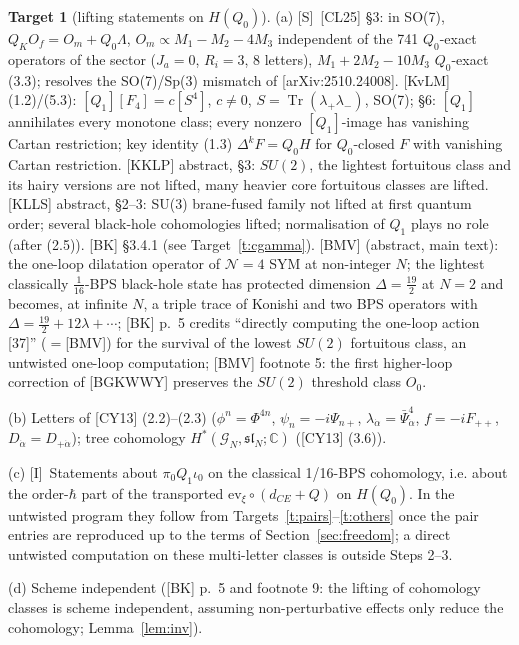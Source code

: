 \documentclass[11pt]{article}
\theoremstyle{definition}
\newtheorem{target}{Target}
\newcommand{\Tr}{\operatorname{Tr}}
\newcommand{\Sl}{\textup{[S]}}
\newcommand{\Il}{\textup{[I]}}
\begin{document}
\begin{target}[lifting statements on $H(Q_0)$]\label{t:lift}
(a) \Sl\ [CL25] \S3: in SO(7), $Q_KO_f=O_m+Q_0\Lambda$, $O_m\propto M_1-M_2-4M_3$ independent of the 741 $Q_0$-exact operators of the sector ($J_a=0$, $R_i=3$, 8 letters), $M_1+2M_2-10M_3$ $Q_0$-exact (3.3); resolves the SO(7)/Sp(3) mismatch of [arXiv:2510.24008]. [KvLM] (1.2)/(5.3): $[Q_1][F_4]=c[S^4]$, $c\neq0$, $S=\Tr(\lambda_+\lambda_-)$, SO(7); \S6: $[Q_1]$ annihilates every monotone class; every nonzero $[Q_1]$-image has vanishing Cartan restriction; key identity (1.3) $\Delta^kF=Q_0H$ for $Q_0$-closed $F$ with vanishing Cartan restriction. [KKLP] abstract, \S3: $SU(2)$, the lightest fortuitous class and its hairy versions are not lifted, many heavier core fortuitous classes are lifted. [KLLS] abstract, \S2--3: SU(3) brane-fused family not lifted at first quantum order; several black-hole cohomologies lifted; normalisation of $Q_1$ plays no role (after (2.5)). [BK] \S3.4.1 (see Target~\ref{t:cgamma}). [BMV] (abstract, main text): the one-loop dilatation operator of $\mathcal N=4$ SYM at non-integer $N$; the lightest classically $\frac1{16}$-BPS black-hole state has protected dimension $\Delta=\frac{19}2$ at $N=2$ and becomes, at infinite $N$, a triple trace of Konishi and two BPS operators with $\Delta=\frac{19}2+12\lambda+\cdots$; [BK] p.~5 credits ``directly computing the one-loop action [37]'' ($=$[BMV]) for the survival of the lowest $SU(2)$ fortuitous class, an untwisted one-loop computation; [BMV] footnote 5: the first higher-loop correction of [BGKWWY] preserves the $SU(2)$ threshold class $O_0$.

(b) Letters of [CY13] (2.2)--(2.3) ($\phi^n=\Phi^{4n}$, $\psi_n=-i\Psi_{n+}$, $\lambda_{\dot\alpha}=\bar\Psi^4_{\dot\alpha}$, $f=-iF_{++}$, $D_{\dot\alpha}=D_{+\dot\alpha}$); tree cohomology $H^*(\mathcal G_N,\mathfrak{sl}_N;\mathbb C)$ ([CY13] (3.6)).

(c) \Il\ Statements about $\pi_0Q_1\iota_0$ on the classical 1/16-BPS cohomology, i.e. about the order-$\hbar$ part of the transported $\mathrm{ev}_\xi\circ(d_{CE}+Q)$ on $H(Q_0)$. In the untwisted program they follow from Targets~\ref{t:pairs}--\ref{t:others} once the pair entries are reproduced up to the terms of Section~\ref{sec:freedom}; a direct untwisted computation on these multi-letter classes is outside Steps 2--3.

(d) Scheme independent ([BK] p.~5 and footnote 9: the lifting of cohomology classes is scheme independent, assuming non-perturbative effects only reduce the cohomology; Lemma~\ref{lem:inv}).
\end{target}
\end{document}
